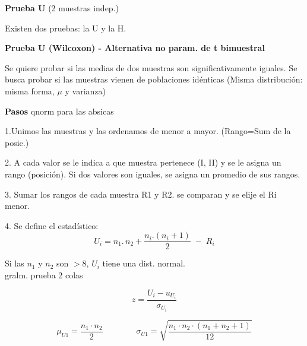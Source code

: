 \documentclass[10pt,a4paper]{article}
\begin{document}
{\Large\bfseries Prueba U} {\large (2 muestras indep.)}
\vspace{4pt}

Existen dos pruebas: la U y la H.

\textbf{Prueba U (Wilcoxon) - Alternativa no param. de t bimuestral}

Se quiere probar si las medias de dos muestras son significativamente iguales. Se busca probar si las muestras vienen de poblaciones idénticas (Misma distribución: misma forma, $\mu$ y varianza)

\textbf{Pasos} \hspace{1.2cm} qnorm para las absicas

1.Unimos las muestras y las ordenamos de menor a mayor. (Rango=Sum de la posic.)

2. A cada valor se le indica a que muestra pertenece (I, II) y se le asigna un rango (posición). Si dos valores son iguales, se asigna un promedio de sus rangos.

3. Sumar los rangos de cada muestra R1 y R2. se comparan y se elije el Ri menor.

4. Se define el estadístico:
\[
U_i = n_1.\, n_2 + \frac{n_i.(n_i+1)}{2} \; - \; R_i
\]

\begin{minipage}{0.52\textwidth}
Si las $n_1$ y $n_2$ son $> 8$, $U_i$ tiene una dist. normal. \\
gralm. prueba 2 colas
\end{minipage}
\begin{minipage}{0.45\textwidth}
\[
z = \frac{U_i - u_{U_i}}{\sigma_{U_i}}
\]
\end{minipage}

\[
\mu_{U1} = \frac{n_1\cdot n_2}{2}
\qquad\qquad
\sigma_{U1} = \sqrt{\frac{n_1\cdot n_2\cdot(n_1+n_2+1)}{12}}
\]
\end{document}
